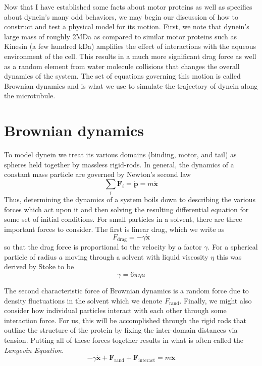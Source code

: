 Now that I have established some facts about motor proteins as well as specifics about dynein's many odd behaviors, we may begin our discussion of how to construct and test a physical model for its motion. First, we note that dynein's large mass of roughly 2MDa \cite{johnson1983structure} as compared to similar motor proteins such as Kinesin (a few hundred kDa) \cite{liao1998kinesin} amplifies the effect of interactions with the  aqueous environment of the cell. This results in a much more significant drag force as well as a random element from water molecule collisions that changes the overall dynamics of the system. The set of equations governing this motion is called Brownian dynamics and is what we use to simulate the trajectory of dynein along the microtubule. 
	\section{Brownian dynamics}
	To model dynein we treat its various domains (binding, motor, and tail) as spheres held together by massless rigid-rods. In general, the dynamics of a constant mass particle are governed by Newton's second law
	\begin{equation}
		\sum_i \mathbf{F}_i = \dot{\mathbf{p}} = m\ddot{\mathbf{x}}
	\end{equation}
	Thus, determining the dynamics of a system boils down to describing the various forces which act upon it and then solving the resulting differential equation for some set of initial conditions. For small particles in a solvent, there are three important forces to consider. The first is linear drag, which we write as 
	\begin{equation}
		F_\text{drag} = -\gamma\dot{\mathbf{x}}
	\end{equation}
	so that the drag force is proportional to the velocity by a factor $\gamma$. For a spherical particle of radius $a$ moving through a solvent with liquid viscosity $\eta$ this was derived by Stoke to be 
	\begin{equation}
		\gamma = 6\pi\eta a
	\end{equation}
	
	
	The second characteristic force of Brownian dynamics is a random force due to density fluctuations in the solvent which we denote $F_\text{rand}$. Finally, we might also consider how individual particles interact with each other through some interaction force. For us, this will be accomplished through the rigid rods that outline the structure of the protein by fixing the inter-domain distances via tension. Putting all of these forces together results in what is often called the \textit{Langevin Equation}.
	\begin{equation}
		 -\gamma\dot{\mathbf{x}}+\mathbf{F}_\text{rand} + \mathbf{F}_\text{interact} = m\ddot{\mathbf{x}} 
	\end{equation}
	
